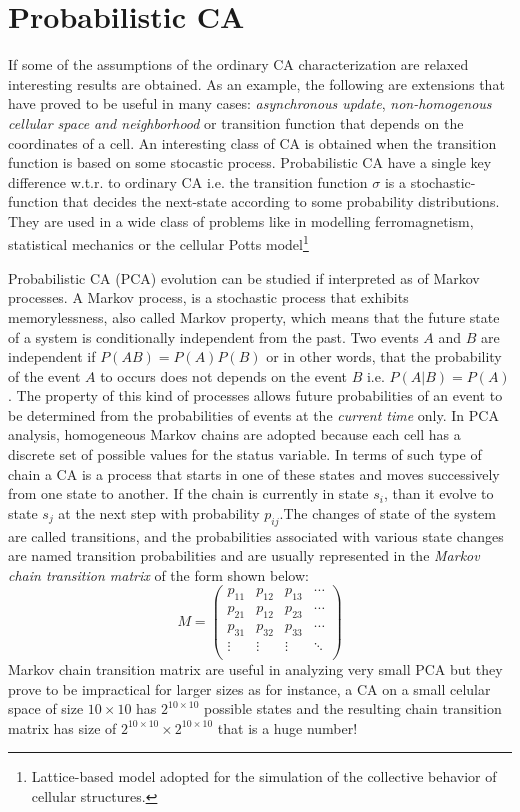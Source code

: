 \section{Probabilistic CA}
If some of the assumptions of the ordinary CA characterization are relaxed interesting results are obtained.
As an example, the following are extensions that have proved to be useful in many cases: \textit{asynchronous update}, \textit{non-homogenous cellular space and neighborhood} or  transition function that depends on the coordinates of a cell. An interesting class of CA is obtained when the transition function is based on some stocastic process. 
Probabilistic CA\cite{MAIRESSE201442} have a single key difference w.t.r. to ordinary CA i.e. the transition function $\sigma$ is a stochastic-function that decides the next-state according to some probability distributions.
They are used in a wide class of
problems like in modelling ferromagnetism, statistical mechanics
\cite{Vichniac1984} or the cellular Potts model\footnote{Lattice-based model adopted for the simulation of the collective behavior of cellular structures.}\cite{RevModPhys.54.235}

Probabilistic CA (PCA) evolution can be studied if interpreted as of Markov processes.
A Markov process, is a stochastic process that exhibits
memorylessness, also  called Markov property, which means that the
future state of  a system is conditionally independent from the past.
 Two events $A$ and $B$ are independent if
 $P(A B)=P(A)P(B)$ or in other words, that the probability of the event $A$ to occurs does not depends on the event $B$ i.e. $P(A|B)=P(A)$. 
The property of this kind of  processes allows  future probabilities of an event to be
determined from the probabilities of events at the \textit{current time} only.
In PCA analysis, homogeneous Markov chains are adopted because each cell has a
discrete set of possible values for the status variable.
In terms of such  type of chain a CA is a process that starts in one of these states and moves
successively from one state to another. If the chain is currently in state
$s_i$, than it evolve to state $s_j$ at
the next step with probability $p_{ij}$.The changes of state
of the system are called transitions, and the probabilities associated with
various state changes are named transition probabilities and are usually represented
in the \textit{Markov chain transition matrix} of the form shown below:
\[
M =
\left( {\begin{array}{cccc}
p_{11} & p_{12} & p_{13} &\cdots \\
p_{21} & p_{12} & p_{23} &\cdots \\
p_{31} & p_{32} & p_{33} &\cdots \\
\vdots & \vdots  &\vdots& \ddots\\
\end{array} } \right)
\]
Markov chain transition matrix are useful in analyzing very small PCA but they prove to be impractical for larger sizes as for instance, a
CA on a small celular space of size $10\times10$  has
$2^{10\times10}$ possible states and the resulting chain transition matrix
has size of $2^{10\times10}\times2^{10\times10}$ that is a
huge number! 
